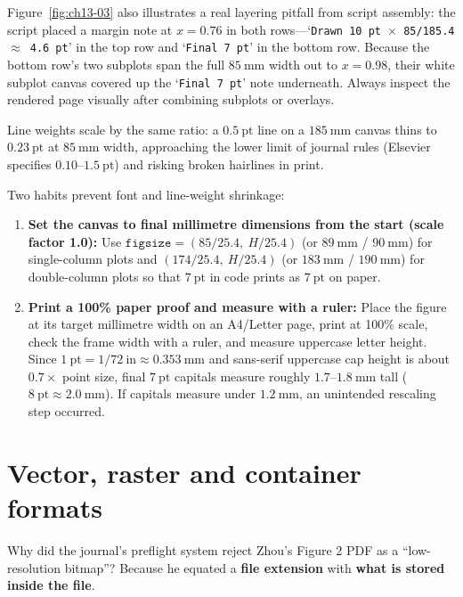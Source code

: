 Figure~\ref{fig:ch13-03} also illustrates a real layering pitfall from script assembly: the script placed a margin note at $x = 0.76$ in both rows---`\texttt{Drawn 10 pt $\times$ 85/185.4 $\approx$ 4.6 pt}' in the top row and `\texttt{Final 7 pt}' in the bottom row. Because the bottom row's two subplots span the full $85\ \text{mm}$ width out to $x = 0.98$, their white subplot canvas covered up the `\texttt{Final 7 pt}' note underneath. Always inspect the rendered page visually after combining subplots or overlays.

Line weights scale by the same ratio: a $0.5\ \text{pt}$ line on a $185\ \text{mm}$ canvas thins to $0.23\ \text{pt}$ at $85\ \text{mm}$ width, approaching the lower limit of journal rules (Elsevier specifies $0.10\text{--}1.5\ \text{pt}$) and risking broken hairlines in print.

Two habits prevent font and line-weight shrinkage:
\begin{enumerate}
\item \textbf{Set the canvas to final millimetre dimensions from the start (scale factor 1.0):} Use $\texttt{figsize}=(85/25.4,\ H/25.4)$ (or $89\ \text{mm}$ / $90\ \text{mm}$) for single-column plots and $(174/25.4,\ H/25.4)$ (or $183\ \text{mm}$ / $190\ \text{mm}$) for double-column plots so that $7\ \text{pt}$ in code prints as $7\ \text{pt}$ on paper.
\item \textbf{Print a 100\% paper proof and measure with a ruler:} Place the figure at its target millimetre width on an A4/Letter page, print at 100\% scale, check the frame width with a ruler, and measure uppercase letter height. Since $1\ \text{pt} = 1/72\ \text{in} \approx 0.353\ \text{mm}$ and sans-serif uppercase cap height is about $0.7\times$ point size, final $7\ \text{pt}$ capitals measure roughly $1.7\text{--}1.8\ \text{mm}$ tall ($8\ \text{pt} \approx 2.0\ \text{mm}$). If capitals measure under $1.2\ \text{mm}$, an unintended rescaling step occurred.
\end{enumerate}

\section{Vector, raster and container formats}

Why did the journal's preflight system reject Zhou's Figure 2 PDF as a ``low-resolution bitmap''? Because he equated a \textbf{file extension} with \textbf{what is stored inside the file}.

